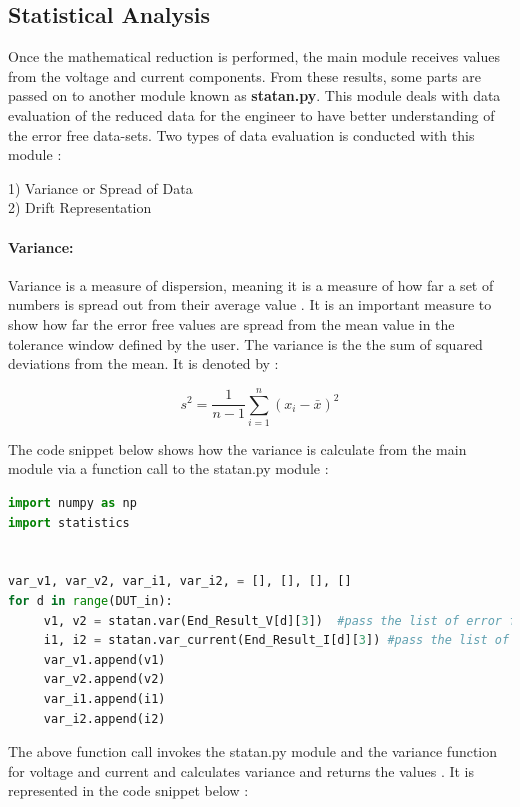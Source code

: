 \subsection{Statistical Analysis}\label{sec:StatAn}

Once the mathematical reduction is performed, the main module receives values from the voltage and current components. From these results, some parts are passed on to another module known as \textbf{statan.py}. This module deals with data evaluation of the reduced data for the engineer to have better understanding of the error free data-sets. Two types of data evaluation is conducted with this module : 

1) Variance or Spread of Data \\ 2) Drift Representation

\paragraph{Variance:}

Variance is a measure of dispersion, meaning it is a measure of how far a set of numbers is spread out from their average value \cite{Var}. It is an important measure to show how far the error free values are spread from the mean value in the tolerance window defined by the user. The variance is the the sum of squared deviations from the mean. It is denoted by : 

\begin{equation}
s^2 = \frac{1}{n-1} \sum_{i=1}^{n} (x_i - \bar{x})^2
\end{equation}

The code snippet below shows how the variance is calculate from the main module via a function call to the statan.py module : \\

\begin{lstlisting}[language = Python]
import numpy as np
import statistics


var_v1, var_v2, var_i1, var_i2, = [], [], [], []
for d in range(DUT_in):
     v1, v2 = statan.var(End_Result_V[d][3])  #pass the list of error free voltage values to the function
     i1, i2 = statan.var_current(End_Result_I[d][3]) #pass the list of error free current values to the function
     var_v1.append(v1)
     var_v2.append(v2)
     var_i1.append(i1)
     var_i2.append(i2)
\end{lstlisting}


The above function call invokes the statan.py module and the variance function for voltage and current and calculates 
variance and returns the values . It is represented in the code snippet below : 

